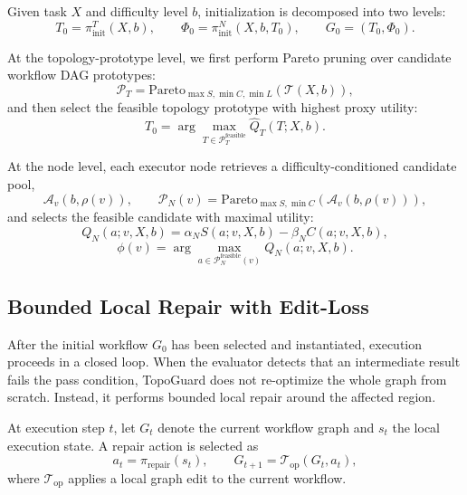 \documentclass[manuscript,review,anonymous]{acmart}
\begin{document}
Given task $X$ and difficulty level $b$, initialization is decomposed into two levels:
\begin{equation}
T_0=\pi_{\text{init}}^{T}(X,b),
\qquad
\Phi_0=\pi_{\text{init}}^{N}(X,b,T_0),
\qquad
G_0=(T_0,\Phi_0).
\end{equation}

At the topology-prototype level, we first perform Pareto pruning over candidate workflow DAG prototypes:
\begin{equation}
\mathcal{P}_T=\text{Pareto}_{\max S,\min C,\min L}(\mathcal{T}(X,b)),
\end{equation}
and then select the feasible topology prototype with highest proxy utility:
\begin{equation}
T_0=\arg\max_{T\in\mathcal{P}_T^{\text{feasible}}}\widehat{Q}_T(T;X,b).
\end{equation}

At the node level, each executor node retrieves a difficulty-conditioned candidate pool,
\begin{equation}
\mathcal{A}_v(b,\rho(v)),
\qquad
\mathcal{P}_N(v)=\text{Pareto}_{\max S,\min C}(\mathcal{A}_v(b,\rho(v))),
\end{equation}
and selects the feasible candidate with maximal utility:
\begin{equation}
Q_N(a;v,X,b)=\alpha_N S(a;v,X,b)-\beta_N C(a;v,X,b),
\end{equation}
\begin{equation}
\phi(v)=\arg\max_{a\in\mathcal{P}_N^{\text{feasible}}(v)}Q_N(a;v,X,b).
\end{equation}

\subsection{Bounded Local Repair with Edit-Loss}
\label{sec:repair}

After the initial workflow $G_0$ has been selected and instantiated, execution proceeds in a closed loop.
When the evaluator detects that an intermediate result fails the pass condition, TopoGuard does not re-optimize the whole graph from scratch.
Instead, it performs bounded local repair around the affected region.

At execution step $t$, let $G_t$ denote the current workflow graph and $s_t$ the local execution state.
A repair action is selected as
\begin{equation}
a_t=\pi_{\mathrm{repair}}(s_t),
\qquad
G_{t+1}=\mathcal{T}_{\mathrm{op}}(G_t,a_t),
\label{eq:repair_transition}
\end{equation}
where $\mathcal{T}_{\mathrm{op}}$ applies a local graph edit to the current workflow.
\end{document}
